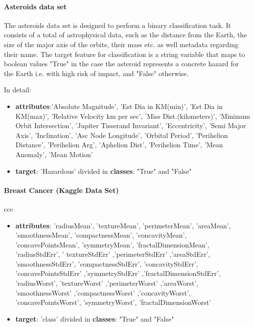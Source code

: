 \documentclass{article}
\begin{document}
\paragraph{Asteroids data set}
The asteroids data set is designed to perform a binary classification task. It consists of a total of astrophysical data, such as the distance from the Earth, the size of the major axis of the orbits, their mass etc. as well metadata regarding their name. The target feature for classification is a string variable that maps to boolean values "True" in the case the asteroid represents a concrete hazard for the Earth i.e. with high risk of impact, and "False" otherwise.

In detail:
\begin{itemize}
	\item  \textbf{attributes}:'Absolute Magnitude', 'Est Dia in KM(min)', 'Est Dia in KM(max)', 'Relative Velocity km per sec', 'Miss Dist.(kilometers)', 'Minimum Orbit Intersection', 'Jupiter Tisserand Invariant', 'Eccentricity', 'Semi Major Axis', 'Inclination', 'Asc Node Longitude', 'Orbital Period', 'Perihelion   Distance', 'Perihelion Arg', 'Aphelion Dist', 'Perihelion Time', 'Mean Anomaly', 'Mean Motion' \\


	\item  \textbf{target}: 'Hazardous' divided in \textbf{classes}: "True" and "False" \\
\end{itemize}


\paragraph{Breast Cancer (Kaggle Data Set)}
ccc

\begin{itemize}
	\item  \textbf{attributes}: 'radiusMean', 'textureMean', 'perimeterMean', 'areaMean',
	'smoothnessMean', 'compactnessMean', 'concavityMean',
	'concavePointsMean', 'symmetryMean', 'fractalDimensionMean',
	'radiusStdErr', ' textureStdErr' ,'perimeterStdErr' ,'areaStdErr',
	'smoothnessStdErr', 'compactnessStdErr', 'concavityStdErr',
	'concavePointsStdErr' ,'symmetryStdErr' ,'fractalDimensionStdErr',
	'radiusWorst', 'textureWorst' ,'perimeterWorst' ,'areaWorst',
	'smoothnessWorst' ,'compactnessWorst' ,'concavityWorst',
	'concavePointsWorst', 'symmetryWorst', 'fractalDimensionWorst' \\

	\item  \textbf{target}: 'class' divided in \textbf{classes}: "True" and "False" \\
\end{itemize}
\end{document}
